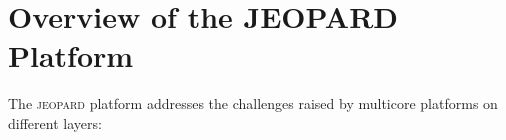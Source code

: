 \documentclass{sig-alternate}
\newcommand{\acronym}[1]{\textsc{#1}}
\begin{document}
\section{Overview of the JEOPARD Platform}\label{sec:over}



The \acronym{jeopard} platform addresses the challenges 
raised by multicore platforms on different layers:
\end{document}
